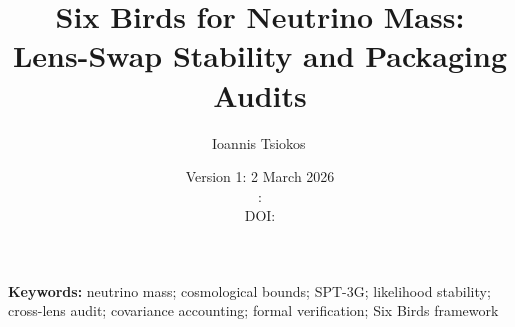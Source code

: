 \documentclass[11pt]{article}
\title{Six Birds for Neutrino Mass:\texorpdfstring{\\}{ } Lens-Swap Stability and Packaging Audits}
\author{Ioannis Tsiokos\,\orcidlink{0009-0009-7659-5964}}
\affiliation{}
\date{Version 1: 2 March 2026\\[2pt]\manuscriptversion: \manuscriptdate\ifpaperhasdoi\\[4pt]{\small DOI: \href{https://doi.org/\paperdoi}{\paperdoi}}\fi}
\makeatletter
\theoremstyle{remark}
\numberwithin{equation}{section}
\newcommand{\printaffiliation}{\begin{center}\small \@affiliation\end{center}}
\makeatother
\begin{document}
\maketitle
\thispagestyle{firstpage}
\printaffiliation

\begin{abstract}

\end{abstract}

\noindent\textbf{Keywords:} neutrino mass; cosmological bounds; SPT-3G; likelihood stability; cross-lens audit; covariance accounting; formal verification; Six Birds framework












\appendix






\end{document}
